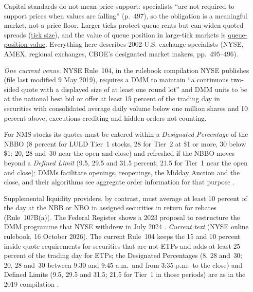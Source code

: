 \begin{qfdefinition}
 Capital standards do not mean price support: specialists ``are not required to support prices when values are falling'' (p.~497), so the obligation is a meaningful market, not a price floor. Larger ticks protect queue rents but can widen quoted spreads (\hyperref[def:tick-size]{tick size}), and the value of queue position in large-tick markets is \hyperref[res:queue-position-value]{queue-position value}. Everything here describes 2002 U.S. exchange specialists (NYSE, AMEX, regional exchanges, CBOE's designated market makers, pp.~495--496).

\emph{One current venue}. NYSE Rule~104, in the rulebook compilation NYSE publishes (file last modified 9 May 2019), requires a DMM to maintain ``a continuous two-sided quote with a displayed size of at least one round lot'' and DMM units to be at the national best bid or offer at least 15 percent of the trading day in securities with consolidated average daily volume below one million shares and 10 percent above, executions crediting and hidden orders not counting.

For NMS stocks its quotes must be entered within a \emph{Designated Percentage} of the NBBO (8 percent for LULD Tier~1 stocks, 28 for Tier~2 at \$1 or more, 30 below \$1; 20, 28 and~30 near the open and close) and refreshed if the NBBO moves beyond a \emph{Defined Limit} (9.5, 29.5 and 31.5 percent; 21.5 for Tier~1 near the open and close); DMMs facilitate openings, reopenings, the Midday Auction and the close, and their algorithms see aggregate order information for that purpose \citep[Rule~104(a)(1)--(3) and~(b)]{nyse-rules-2019}.

Supplemental liquidity providers, by contrast, must average at least 10 percent of the day at the NBB or NBO in assigned securities in return for rebates (Rule~107B(a)). The Federal Register shows a 2023 proposal to restructure the DMM programme that NYSE withdrew in July 2024 \citep[88~FR 77625; 89~FR 56456; 84~FR 51205]{fr-nyse-dmm-2023-withdrawn}. \emph{Current text} (NYSE online rulebook, 16 October 2026). The current Rule~104 keeps the 15 and 10 percent inside-quote requirements for securities that are not ETPs and adds at least 25 percent of the trading day for ETPs; the Designated Percentages (8, 28 and~30; 20, 28 and~30 between 9:30 and 9:45 a.m.\ and from 3:35 p.m.\ to the close) and Defined Limits (9.5, 29.5 and 31.5; 21.5 for Tier~1 in those periods) are as in the 2019 compilation \citep[Rule~104(a)(1) and~(a)(1)(A), export pp.~1--2]{nyse-rule104-2026}.


\end{qfdefinition}
